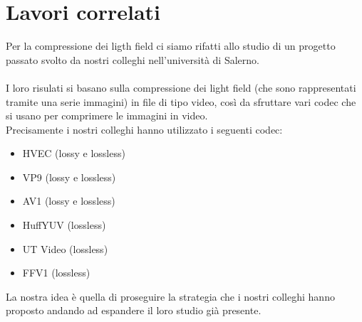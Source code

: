 \chapter{Lavori correlati}

Per la compressione dei ligth field ci siamo rifatti allo studio di un progetto passato svolto da nostri colleghi nell'università di Salerno\cite{LigthFieldCompression}.
\\
\\
I loro risulati si basano sulla compressione dei light field (che sono rappresentati tramite una serie immagini) in file di tipo video, così da sfruttare vari codec che si usano per comprimere le immagini in video.
\\
Precisamente i nostri colleghi hanno utilizzato i seguenti codec:
\begin{itemize}
    \item HVEC (lossy e lossless)
    \item VP9 (lossy e lossless)
    \item AV1 (lossy e lossless)
    \item HuffYUV (lossless)
    \item UT Video (lossless)
    \item FFV1 (lossless)
\end{itemize}
La nostra idea è quella di proseguire la strategia che i nostri colleghi hanno proposto andando ad espandere il loro studio già presente.
